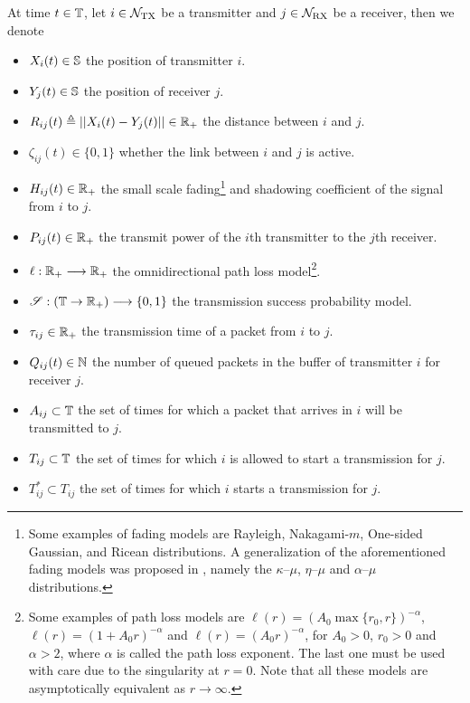 At time $t\in\T$, let $i\in\cal{N}_\TX$ be a transmitter and $j\in\cal{N}_\RX$ be a receiver, then we denote%
\begin{itemize}[itemsep=3pt,parsep=3pt,topsep=3pt,partopsep=3pt]
    \item $X_i(t) \in \S$ the position of transmitter $i$.
    \item $Y_j(t) \in \S$ the position of receiver $j$.
    \item $R_{ij}(t) \triangleq ||X_i(t) - Y_j(t)||\in\R_+$ the distance between $i$ and $j$.
    \item $\zeta_{ij}(t)\in\{0,1\}$ whether the link between $i$ and $j$ is active.
    \item $H_{ij}(t) \in \R_+$ the small scale fading\footnote{Some examples of fading models are Rayleigh, Nakagami-$m$, One-sided Gaussian, and Ricean distributions. A generalization of the aforementioned fading models was proposed in \cite{yacoub2007alpha,yacoub2007kappa}, namely the $\kappa$--$\mu$, $\eta$--$\mu$ and $\alpha$--$\mu$ distributions.} and shadowing coefficient of the signal from $i$ to $j$.
    \item $P_{ij}(t) \in \R_+$ the transmit power of the $i$th transmitter to the $j$th receiver.
    \item $\ell:\R_+\longrightarrow\R_+$ the omnidirectional path loss model\footnote{Some examples of path loss models are $\ell(r) = (A_0 \max\{r_0,r\})^{-\alpha}$, $\ell(r) = (1 + A_0 r)^{-\alpha}$ and $\ell(r) = (A_0 r)^{-\alpha}$, for $A_0>0$, $r_0>0$ and $\alpha>2$, where $\alpha$ is called the path loss exponent. The last one must be used with care due to the singularity at $r=0$. Note that all these models are asymptotically equivalent as $r\to\infty$.}.
    \item $\mathscr{S}:(\T\to\R_+)\longrightarrow\{0,1\}$ the transmission success probability model.
    \item $\tau_{ij}\in\R_+$ the transmission time of a packet from $i$ to $j$.
    \item $Q_{ij}(t)\in\N$ the number of queued packets in the buffer of transmitter $i$ for receiver $j$.
    \item $A_{ij} \subset \T$ the set of times for which a packet that arrives in $i$ will be transmitted to $j$.
    \item $T_{ij}\subset \T$ the set of times for which $i$ is allowed to start a transmission for $j$. %
    \item $T_{ij}^*\subset T_{ij}$ the set of times for which $i$ starts a transmission for $j$.
\end{itemize}

